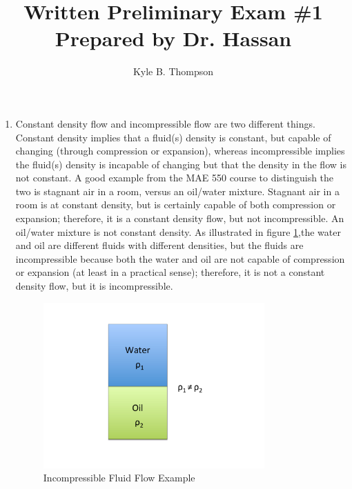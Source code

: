 \documentclass[a4paper]{article}
\title{Written Preliminary Exam \#1 \break
       Prepared by Dr. Hassan}
\author{ Kyle B. Thompson }
\begin{document}
\maketitle

\begin{enumerate}
  \item Constant density flow and incompressible flow are two different things.
    Constant density implies that a fluid(s) density is constant, but capable of
    changing (through compression or expansion), whereas incompressible implies
    the fluid(s) density is incapable of changing but that the density in the
    flow is not constant.  A good example from the MAE 550 course to distinguish
    the two is stagnant air in a room, versus an oil/water mixture.  Stagnant
    air in a room is at constant density, but is certainly capable of both
    compression or expansion; therefore, it is a constant density flow, but not
    incompressible.  An oil/water mixture is not constant density.  As
    illustrated in figure \ref{fig:incompressible},the
    water and oil are different fluids with different densities, but the fluids
    are incompressible because both the water and oil are not capable of
    compression or expansion (at least in a practical sense); therefore, it is
    not a constant density flow, but it is incompressible.

    \begin{figure}[h]
      \centering
      \includegraphics[width=0.8\textwidth,trim={0 2cm 0 2cm},clip]{oil_water_fig}
      \caption{Incompressible Fluid Flow Example}
      \label{fig:incompressible}
    \end{figure}


\end{enumerate}
\end{document}
